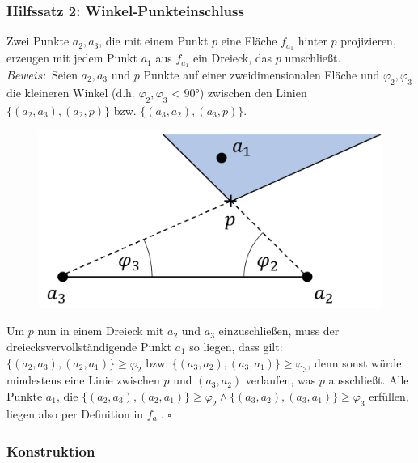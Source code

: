 \documentclass[a4paper]{extarticle}
\begin{document}
    \subsubsection{Hilfssatz 2: Winkel-Punkteinschluss}
    Zwei Punkte $a_2, a_3$, die mit einem Punkt $p$ eine Fläche $f_{a_1}$ hinter $p$ projizieren, 
    erzeugen mit jedem Punkt $a_1$ aus $f_{a_1}$ ein Dreieck, das $p$ umschließt. \\
    $Beweis:$ Seien $a_2, a_3$ und $p$ Punkte auf einer zweidimensionalen Fläche und $\varphi_2, 
    \varphi_3$ die kleineren Winkel (d.h. $\varphi_2, \varphi_3$ < 90°) zwischen den Linien 
    $ \{ (a_2,a_3),(a_2,p) \} $ bzw. $ \{ (a_3,a_2),(a_3,p) \} $.
    
    \begin{figure}[!ht]
        \centering	
        \includegraphics[scale=0.15]{bilder/tri_hilfssatz.pdf}
        \label{fig:triangulation_hilfssatz_1}
    \end{figure}

    Um $p$ nun in einem Dreieck mit $a_2$ und $a_3$ einzuschließen, muss der 
    dreiecksvervollständigende Punkt $a_1$ so liegen, dass gilt:
    $ \{ (a_2,a_3),(a_2,a_1) \} \geq \varphi_2 $ bzw. $ \{ (a_3,a_2),(a_3,a_1) \} \geq \varphi_3 $, 
    denn sonst würde mindestens eine Linie zwischen $p$ und $(a_3,a_2)$ verlaufen, was $p$ 
    ausschließt. Alle Punkte $a_1$, die 
    $ \{ (a_2,a_3),(a_2,a_1) \} \geq \varphi_2 \land \{ (a_3,a_2),(a_3,a_1) \} \geq \varphi_3 $ 
    erfüllen, liegen also per Definition in $f_{a_1}$. $\square$

    \subsubsection{Konstruktion}
\end{document}
